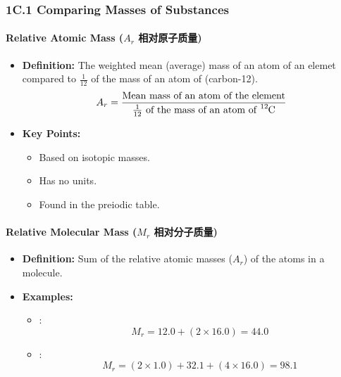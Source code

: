 
\subsubsection{1C.1 Comparing Masses of Substances}
\paragraph{Relative Atomic Mass ($A_r$ 相对原子质量)}
\begin{itemize}
    \item \textbf{Definition:} The weighted mean (average) mass of an atom of an elemet compared to $\frac{1}{12}$ of the mass of
    an atom of  (carbon-12).
    \begin{equation}
        A_r = \frac{\text{Mean mass of an atom of the element}}{\frac{1}{12}\text{ of the mass of an atom of \ce{^{12}C}}}
    \end{equation}
    \item \textbf{Key Points:}
    \begin{itemize}
        \item Based on isotopic masses.
        \item Has no units.
        \item Found in the preiodic table.
    \end{itemize}
\end{itemize}

\paragraph{Relative Molecular Mass ($M_r$ 相对分子质量)}
\begin{itemize}
    \item \textbf{Definition:} Sum of the relative atomic masses ($A_r$) of the atoms in a molecule.
    \item \textbf{Examples:}
    \begin{itemize}
        \item {}:
        \begin{equation}
            M_r = 12.0 + (2 \times 16.0) = 44.0
        \end{equation}
        \item {}:
        \begin{equation}
            M_r = (2 \times 1.0) + 32.1 + (4 \times 16.0) = 98.1
        \end{equation}
    \end{itemize}
\end{itemize}

